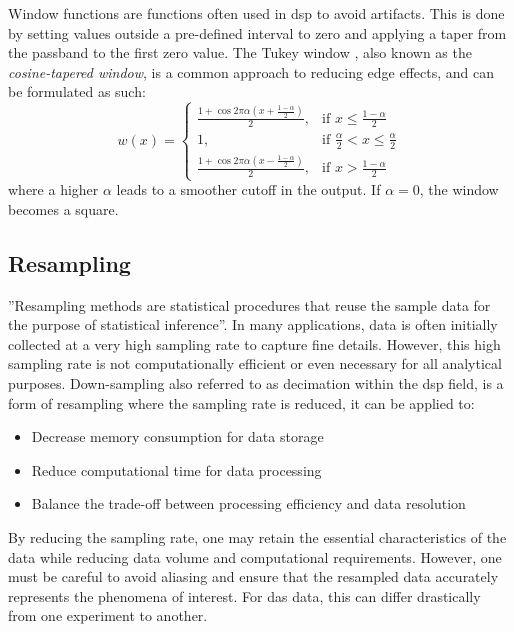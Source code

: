 Window functions are functions often used in \acrshort{dsp} to avoid artifacts. This is done by setting values outside a pre-defined interval to zero and applying a taper from the passband to the first zero value. The Tukey window \cite{tukey1967introduction}, also known as the \textit{cosine-tapered window}, is a common approach to reducing edge effects, and can be formulated as such:
\[
    w(x)= 
\begin{cases}
    \frac{1 + \cos{2 \pi \alpha (x + \frac{1-\alpha}{2})}}{2}, & \text{if } x \leq \frac{1-\alpha}{2}\\
    1,              & \text{if } \frac{\alpha}{2} < x \leq \frac{\alpha}{2}\\
    \frac{1 + \cos{2 \pi \alpha (x - \frac{1-\alpha}{2})}}{2}, & \text{if } x > \frac{1-\alpha}{2}
\end{cases}
\]
where a higher $\alpha$ leads to a smoother cutoff in the output. If $\alpha = 0$, the window becomes a square.
\subsection{Resampling}
%
''Resampling methods are statistical procedures that reuse the sample data for the purpose of statistical inference''\cite{https://doi.org/10.1002/widm.1054}. In many applications, data is often initially collected at a very high sampling rate to capture fine details. However, this high sampling rate is not computationally efficient or even necessary for all analytical purposes. Down-sampling also referred to as decimation within the \acrshort{dsp} field, is a form of resampling where the sampling rate is reduced, it can be applied to:
%
\begin{itemize}
    \item Decrease memory consumption for data storage
    \item Reduce computational time for data processing
    \item Balance the trade-off between processing efficiency and data resolution
\end{itemize}
%
By reducing the sampling rate, one may retain the essential characteristics of the data while reducing data volume and computational requirements. However, one must be careful to avoid aliasing and ensure that the resampled data accurately represents the phenomena of interest. For \acrshort{das} data, this can differ drastically from one experiment to another. 
